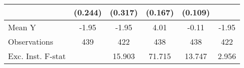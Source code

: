 {\begin{tabular}{l*{5}{c}}
            &     (0.244)         &     (0.317)         &     (0.167)         &     (0.109)         &                     \\
\midrule
Mean Y      &       -1.95         &       -1.95         &        4.01         &       -0.11         &       -1.95         \\
Observations&         439         &         422         &         438         &         438         &         422         \\
Exc. Inst. F-stat&                     &      15.903         &      71.715         &      13.747         &       2.956         \\
\bottomrule
\end{tabular}
}
